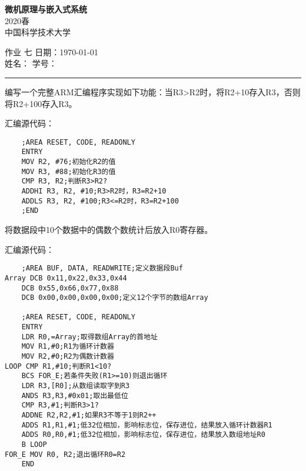 \documentclass[11pt,letter,notitlepage,UTF8]{ctexart}
\newcommand{\name}{\text{胡睿}}  	          			%
\newcommand{\id}{\text{PB17061124}}		        		%
\newcommand{\hwno}{七}                               %
\begin{document}
\vspace*{-4\baselineskip}
\thispagestyle{empty}

\begin{center}
{\bf\large 微机原理与嵌入式系统}\\
{2020春}\\
中国科学技术大学
\end{center}

\noindent
作业 \hwno  
\hfill
日期：{\today}
\\
姓名： \name             			
\hfill
学号： \id						
\hfill

\noindent
\rule{\textwidth}{2pt}

\medskip







\begin{exercise}[7.3]
	编写一个完整ARM汇编程序实现如下功能：当R3>R2时，将R2+10存入R3，否则将R2+100存入R3。
\end{exercise}
\begin{solution}
汇编源代码：
\begin{lstlisting}
	;AREA RESET, CODE, READONLY
	ENTRY
	MOV R2, #76;初始化R2的值
	MOV R3, #88;初始化R3的值
	CMP R3, R2;判断R3>R2?
	ADDHI R3, R2, #10;R3>R2时，R3=R2+10
	ADDLS R3, R2, #100;R3<=R2时，R3=R2+100
	;END
\end{lstlisting}
\end{solution}

\begin{exercise}[7.4]
	将数据段中10个数据中的偶数个数统计后放入R0寄存器。	
\end{exercise}
\begin{solution}
汇编源代码：
\begin{lstlisting}
	;AREA BUF, DATA, READWRITE;定义数据段Buf
Array DCB 0x11,0x22,0x33,0x44
	DCB 0x55,0x66,0x77,0x88
	DCB 0x00,0x00,0x00,0x00;定义12个字节的数组Array

	;AREA RESET, CODE, READONLY
	ENTRY
	LDR R0,=Array;取得数组Array的首地址
	MOV R1,#0;R1为循环计数器
	MOV R2,#0;R2为偶数计数器
LOOP CMP R1,#10;判断R1<10?
	BCS FOR_E;若条件失败(R1>=10)则退出循环
	LDR R3,[R0];从数组读取字到R3
	ANDS R3,R3,#0x01;取出最低位
	CMP R3,#1;判断R3>1?
	ADDNE R2,R2,#1;如果R3不等于1则R2++
	ADDS R1,R1,#1;低32位相加，影响标志位，保存进位，结果放入循环计数器R1
	ADDS R0,R0,#1;低32位相加，影响标志位，保存进位，结果放入数组地址R0
	B LOOP
FOR_E MOV R0, R2;退出循环R0=R2
	END
	
\end{lstlisting}
\end{solution}
\end{document}

